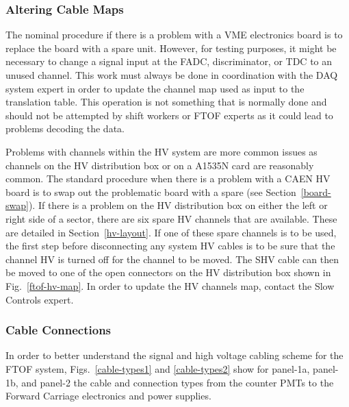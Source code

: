 \documentclass[12pt]{article}
\begin{document}
\subsubsection{Altering Cable Maps}

The nominal procedure if there is a problem with a VME electronics board is to replace 
the board with a spare unit. However, for testing purposes, it might be necessary to 
change a signal input at the FADC, discriminator, or TDC to an unused channel. This 
work must always be done in coordination with the DAQ system expert in order to update 
the channel map used as input to the translation table. This operation is not something 
that is normally done and should not be attempted by shift workers or FTOF experts as 
it could lead to problems decoding the data.

Problems with channels within the HV system are more common issues as channels on the 
HV distribution box or on a A1535N card are reasonably common. The standard procedure 
when there is a problem with a CAEN HV board is to swap out the problematic board with 
a spare (see Section~\ref{board-swap}). If there is a problem on the HV distribution 
box on either the left or right side of a sector, there are six spare HV channels that 
are available. These are detailed in Section~\ref{hv-layout}. If one of these spare 
channels is to be used, the first step before disconnecting any system HV cables is to 
be sure that the channel HV is turned off for the channel to be moved. The SHV cable 
can then be moved to one of the open connectors on the HV distribution box shown in 
Fig.~\ref{ftof-hv-map}. In order to update the HV channels map, contact the Slow 
Controls expert.

\subsubsection{Cable Connections}
\label{cable-connections}

In order to better understand the signal and high voltage cabling scheme for the FTOF 
system, Figs.~\ref{cable-types1} and \ref{cable-types2} show for panel-1a, panel-1b, 
and panel-2 the cable and connection types from the counter PMTs to the Forward Carriage 
electronics and power supplies.
\end{document}
